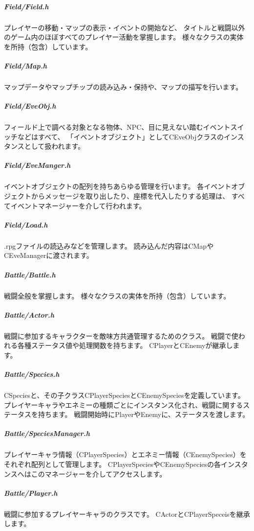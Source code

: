 \subparagraph*{Field/\+Field.\+h}

プレイヤーの移動・マップの表示・イベントの開始など、 タイトルと戦闘以外のゲーム内のほぼすべてのプレイヤー活動を掌握します。 様々なクラスの実体を所持（包含）しています。

\subparagraph*{Field/\+Map.\+h}

マップデータやマップチップの読み込み・保持や、マップの描写を行います。

\subparagraph*{Field/\+Eve\+Obj.\+h}

フィールド上で調べる対象となる物体、\+N\+P\+C、目に見えない踏むイベントスイッチなどはすべて、 「イベントオブジェクト」として\+C\+Eve\+Objクラスのインスタンスとして扱われます。

\subparagraph*{Field/\+Eve\+Manger.\+h}

イベントオブジェクトの配列を持ちあらゆる管理を行います。 各イベントオブジェクトからメッセージを取り出したり、座標を代入したりする処理は、 すべてイベントマネージャーを介して行われます。

\subparagraph*{Field/\+Load.\+h}

.rpgファイルの読込みなどを管理します。 読み込んだ内容は\+C\+Mapや\+C\+Eve\+Managerに渡されます。 



\subparagraph*{Battle/\+Battle.\+h}

戦闘全般を掌握します。 様々なクラスの実体を所持（包含）しています。

\subparagraph*{Battle/\+Actor.\+h}

戦闘に参加するキャラクターを敵味方共通管理するためのクラス。 戦闘で使われる各種ステータス値や処理関数を持ちます。 C\+Playerと\+C\+Enemyが継承します。

\subparagraph*{Battle/\+Species.\+h}

C\+Speciesと、その子クラス\+C\+Player\+Speciesと\+C\+Enemy\+Speciesを定義しています。 プレイヤーキャラやエネミーの種類ごとにインスタンス化され、戦闘に関するステータスを持ちます。 戦闘開始時に\+Playerや\+Enemyに、ステータスを渡します。

\subparagraph*{Battle/\+Species\+Manager.\+h}

プレイヤーキャラ情報（\+C\+Player\+Species）とエネミー情報（\+C\+Enemy\+Species）をそれぞれ配列として管理します。 C\+Player\+Speciesや\+C\+Enemy\+Speciesの各インスタンスへはこのマネージャーを介してアクセスします。

\subparagraph*{Battle/\+Player.\+h}

戦闘に参加するプレイヤーキャラのクラスです。 C\+Actorと\+C\+Player\+Speceisを継承します。


